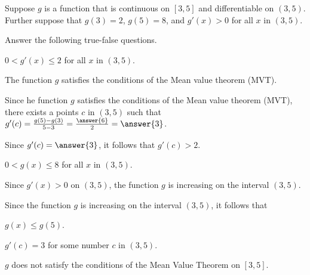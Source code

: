\documentclass{ximera}
\author{Nela Lakos \and Kyle Parsons}
\begin{document}
\begin{exercise}

Suppose $g$ is a function that is continuous on $[3,5]$ and differentiable on $(3,5)$.  Further suppose that $g(3)=2$, $g(5)=8$, and $g'(x)>0$ for all $x$ in $(3,5)$.

Answer the following true-false questions.

$0<g'(x)\leq2$ for all $x$ in $(3,5)$.
\begin{hint}
The function $g$ satisfies the conditions of the Mean value theorem (MVT).
\end{hint}
\begin{hint}
Since he function $g$ satisfies the conditions of the Mean value theorem (MVT), there exists a points $c$ in $(3,5)$ such that $g'(c)=\frac{g(5)-g(3)}{5-3}=\frac{\answer{6}}{2}=\answer{3}$.
\end{hint}
\begin{hint}
Since  $g'(c)=\answer{3}$, it follows that $g'(c)>2$.
\end{hint}
\begin{multipleChoice}
\end{multipleChoice}

$0<g(x)\leq8$ for all $x$ in $(3,5)$.
\begin{hint}
Since $g'(x)>0$ on $(3,5)$, the function $g$ is increasing on the interval $(3,5)$. 
\end{hint}
\begin{hint}
Since  the function $g$ is increasing on the interval $(3,5)$, it follows that

 $g(x)\le g(5)$. 
\end{hint}
\begin{multipleChoice}
\end{multipleChoice}

$g'(c)=3$ for some number $c$ in $(3,5)$.
\begin{multipleChoice}
\end{multipleChoice}

$g$ does not satisfy the conditions of the Mean Value Theorem on $[3,5]$.
\begin{multipleChoice}
\end{multipleChoice}

\end{exercise}
\end{document}
